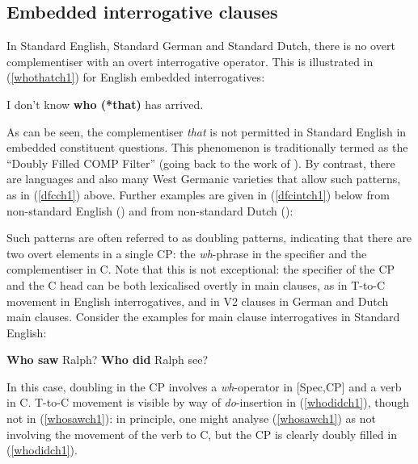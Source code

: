\subsection{Embedded interrogative clauses} \label{sec:1interrogative}
In Standard English, Standard German and Standard Dutch, there is no overt complementiser with an overt interrogative operator. This is illustrated in (\ref{whothatch1}) for English embedded interrogatives:

\ea	I don't know \textbf{who (*that)} has arrived. \label{whothatch1}
\z

As can be seen, the complementiser \textit{that} is not permitted in Standard English in embedded constituent questions. This phenomenon is traditionally termed as the ``Doubly Filled COMP Filter'' (going back to the work of \citealt{chomskylasnik1977}). By contrast, there are languages and also many West Germanic varieties that allow such patterns, as in (\ref{dfcch1}) above. Further examples are given in (\ref{dfcintch1}) below from non-standard English (\citealt[331, ex. 1]{baltin2010}) and from non-standard Dutch (\citealt[32]{bacskaiatkaribaudisch2018}):

\ea \label{dfcintch1}
\z
\z

Such patterns are often referred to as doubling patterns, indicating that there are two overt elements in a single CP: the \textit{wh}-phrase in the specifier and the complementiser in C. Note that this is not exceptional: the specifier of the CP and the C head can be both lexicalised overtly in main clauses, as in T-to-C movement in English interrogatives, and in V2 clauses in German and Dutch main clauses. Consider the examples for main clause interrogatives in Standard English:

\ea \label{ttocch1}
\ea	\textbf{Who saw} Ralph? \label{whosawch1}
\ex	\textbf{Who did} Ralph see? \label{whodidch1}
\z
\z

In this case, doubling in the CP involves a \textit{wh}-operator in [Spec,CP] and a verb in C. T-to-C movement is visible by way of \textit{do}-insertion in (\ref{whodidch1}), though not in (\ref{whosawch1}): in principle, one might analyse (\ref{whosawch1}) as not involving the movement of the verb to C, but the CP is clearly doubly filled in (\ref{whodidch1}).

